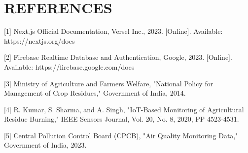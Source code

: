 \documentclass[10pt,a4paper]{article}
\begin{document}
\section{REFERENCES}
[1] Next.js Official Documentation, Versel Inc., 2023. [Online]. Available: https://nextjs.org/docs\par
\vspace{0.5em}
[2] Firebase Realtime Database and Authentication, Google, 2023. [Online]. Available: https://firebase.google.com/docs\par
\vspace{0.5em}
[3] Ministry of Agriculture and Farmers Welfare, "National Policy for Management of Crop Residues," Government of India, 2014.\par
\vspace{0.5em}
[4] R. Kumar, S. Sharma, and A. Singh, "IoT-Based Monitoring of Agricultural Residue Burning," IEEE Sensors Journal, Vol. 20, No. 8, 2020, PP 4523-4531.\par
\vspace{0.5em}
[5] Central Pollution Control Board (CPCB), "Air Quality Monitoring Data," Government of India, 2023.\par
\end{document}
